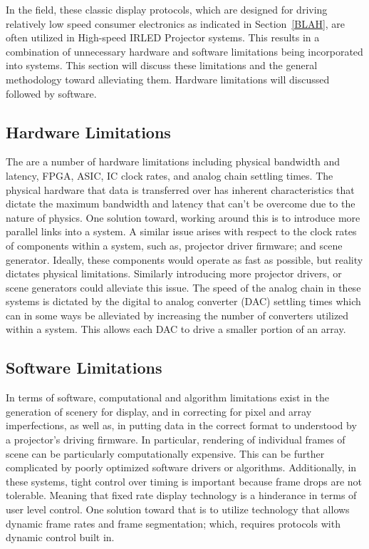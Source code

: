     In the field, these classic display protocols, which are designed for driving relatively low speed consumer electronics as indicated in Section~\ref{BLAH}, are often utilized in High-speed IRLED Projector systems. This results in a combination of unnecessary hardware and software limitations being incorporated into systems. This section will discuss these limitations and the general methodology toward alleviating them. Hardware limitations will discussed followed by software.

    \subsection{Hardware Limitations}
        The are a number of hardware limitations including physical bandwidth and latency, FPGA, ASIC, IC clock rates, and analog chain settling times. The physical hardware that data is transferred over has inherent characteristics that dictate the maximum bandwidth and latency that can't be overcome due to the nature of physics. One solution toward, working around this is to introduce more parallel links into a system. A similar issue arises with respect to the clock rates of components within a system, such as, projector driver firmware; and scene generator. Ideally, these components would operate as fast as possible, but reality dictates physical limitations. Similarly introducing more projector drivers, or scene generators could alleviate this issue. The speed of the analog chain in these systems is dictated by the digital to analog converter (DAC) settling times which can in some ways be alleviated by increasing the number of converters utilized within a system. This allows each DAC to drive a smaller portion of an array.

    \subsection{Software Limitations}
        In terms of software, computational and algorithm limitations exist in the generation of scenery for display, and in correcting for pixel and array imperfections, as well as, in putting data in the correct format to understood by a projector's driving firmware. In particular, rendering of individual frames of scene can be particularly computationally expensive. This can be further complicated by poorly optimized software drivers or algorithms. Additionally, in these systems, tight control over timing is important because frame drops are not tolerable. Meaning that fixed rate display technology is a hinderance in terms of user level control. One solution toward that is to utilize technology that allows dynamic frame rates and frame segmentation; which, requires protocols with dynamic control built in.


